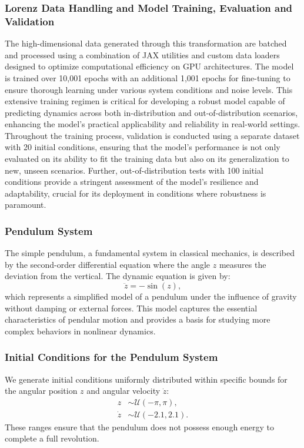 \subsubsection{Lorenz Data Handling and Model Training, Evaluation and Validation}
The high-dimensional data generated through this transformation are batched and processed using a combination of JAX utilities and custom data loaders designed to optimize computational efficiency on GPU architectures. The model is trained over 10,001 epochs with an additional 1,001 epochs for fine-tuning to ensure thorough learning under various system conditions and noise levels. This extensive training regimen is critical for developing a robust model capable of predicting dynamics across both in-distribution and out-of-distribution scenarios, enhancing the model's practical applicability and reliability in real-world settings.\\

Throughout the training process, validation is conducted using a separate dataset with 20 initial conditions, ensuring that the model's performance is not only evaluated on its ability to fit the training data but also on its generalization to new, unseen scenarios. Further, out-of-distribution tests with 100 initial conditions provide a stringent assessment of the model's resilience and adaptability, crucial for its deployment in conditions where robustness is paramount.


\subsubsection{Pendulum System}
The simple pendulum, a fundamental system in classical mechanics, is described by the second-order differential equation where the angle \( z \) measures the deviation from the vertical. The dynamic equation is given by:
\begin{equation}\label{eq:pendel}
    \ddot{z} = -\sin(z),
\end{equation}
which represents a simplified model of a pendulum under the influence of gravity without damping or external forces. This model captures the essential characteristics of pendular motion and provides a basis for studying more complex behaviors in nonlinear dynamics.

\subsubsection{Initial Conditions for the Pendulum System}
We generate initial conditions uniformly distributed within specific bounds for the angular position \( z \) and angular velocity \( \dot{z} \):
\begin{equation}
\begin{aligned}
    z &\sim \mathcal{U}(-\pi, \pi), \\
    \dot{z} &\sim \mathcal{U}(-2.1, 2.1).
\end{aligned}
\end{equation}
These ranges ensure that the pendulum does not possess enough energy to complete a full revolution. 


